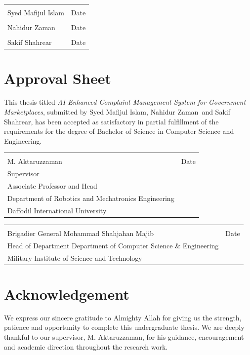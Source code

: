 \documentclass[12pt,a4paper,openany]{book}
\newcommand{\thesistitle}{AI Enhanced Complaint Management System for Government Marketplaces}
\newcommand{\studentone}{Syed Mafijul Islam}
\newcommand{\studenttwo}{Nahidur Zaman}
\newcommand{\studentthree}{Sakif Shahrear}
\newcommand{\supervisor}{M. Aktaruzzaman}
\newcommand{\department}{Department of Computer Science \& Engineering}
\newcommand{\institution}{Military Institute of Science and Technology}
\newcommand{\supervisordesignation}{Associate Professor and Head}
\newcommand{\supervisordepartment}{Department of Robotics and Mechatronics Engineering}
\newcommand{\supervisorinstitution}{Daffodil International University}
\begin{document}
\vspace{2cm}
\noindent\begin{tabular}{p{}p{}}
\hrulefill & \hrulefill\\
\studentone & Date\\[1.4cm]
\hrulefill & \hrulefill\\
\studenttwo & Date\\[1.4cm]
\hrulefill & \hrulefill\\
\studentthree & Date
\end{tabular}

\chapter*{Approval Sheet}
This thesis titled \textit{\thesistitle}, submitted by \studentone, \studenttwo\ and \studentthree, has been accepted as satisfactory in partial fulfillment of the requirements for the degree of Bachelor of Science in Computer Science and Engineering.

\vspace{2.2cm}
\noindent\begin{tabular}{p{}p{}}
\hrulefill & \hrulefill\\
\supervisor & Date\\
Supervisor\\
\supervisordesignation\\
\supervisordepartment\\
\supervisorinstitution
\end{tabular}

\vspace{2.2cm}
\noindent\begin{tabular}{p{}p{}}
\hrulefill & \hrulefill\\
Brigadier General Mohammad Shahjahan Majib & Date\\
Head of Department
\department\\
\institution
\end{tabular}

\chapter*{Acknowledgement}
We express our sincere gratitude to Almighty Allah for giving us the strength, patience and opportunity to complete this undergraduate thesis. We are deeply thankful to our supervisor, \supervisor, for his guidance, encouragement and academic direction throughout the research work.
\end{document}
